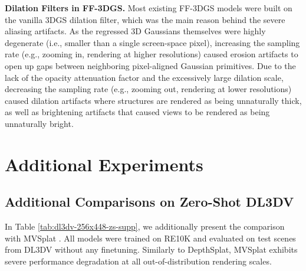 \noindent \textbf{Dilation Filters in FF-3DGS.} Most existing FF-3DGS models \cite{chen2024mvsplat, xu2025depthsplat, ye2024no, huang2025no, huang2025spfsplatv2} were built on the vanilla 3DGS dilation filter, which was the main reason behind the severe aliasing artifacts. As the regressed 3D Gaussians themselves were highly degenerate (i.e., smaller than a single screen-space pixel), increasing the sampling rate (e.g., zooming in, rendering at higher resolutions) caused erosion artifacts to open up gaps between neighboring pixel-aligned Gaussian primitives. Due to the lack of the opacity attenuation factor and the excessively large dilation scale, decreasing the sampling rate (e.g., zooming out, rendering at lower resolutions) caused dilation artifacts where structures are rendered as being unnaturally thick, as well as brightening artifacts that caused views to be rendered as being unnaturally bright.


\section{Additional Experiments}

\subsection{Additional Comparisons on Zero-Shot DL3DV}
In Table \ref{tab:dl3dv-256x448-zs-supp}, we additionally present the comparison with MVSplat \cite{chen2024mvsplat}. All models were trained on RE10K \cite{zhou2018stereo} and evaluated on test scenes from DL3DV \cite{ling2024dl3dv} without any finetuning. Similarly to DepthSplat, MVSplat exhibits severe performance degradation at all out-of-distribution rendering scales.

